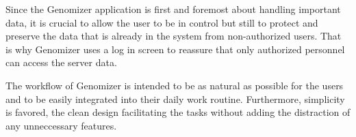 Since the Genomizer application is first and foremost about handling important 
data, it is crucial to allow the user to be in control but still to protect 
and preserve the data that is already in the system from non-authorized users.
That is why Genomizer uses a log in screen to reassure that only authorized 
personnel can access the server data.

The workflow of Genomizer is intended to be as natural as possible for 
the users and to be easily integrated into their daily work routine.
Furthermore, simplicity is favored, the clean design facilitating the tasks
without adding the distraction of any unneccessary features.

